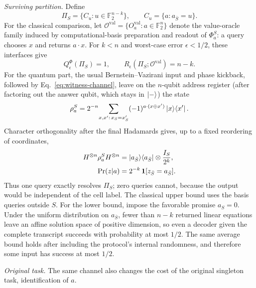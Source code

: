 \documentclass[
  aps,
  pra,
  reprint,
  nofootinbib
]{revtex4-2}
\begin{document}
\emph{Surviving partition.} Define
\begin{equation}
 \Pi_S=\{C_u:u\in\mathbb F_2^{n-k}\},\qquad
 C_u=\{a:a_{\bar S}=u\}.
 \label{eq:surviving-partition}
\end{equation}
For the classical comparison, let \(\mathcal O^{\mathrm{val}}=\{O_a^{\mathrm{val}}:a\in
\mathbb F_2^n\}\) denote the value-oracle family induced by
computational-basis preparation and readout of \(\Phi_a^S\): a query chooses
\(x\) and returns \(a\cdot x\). For \(k<n\) and worst-case error
\(\epsilon<1/2\), these interfaces give
\begin{equation}
 Q_\epsilon^{\Phi}(\Pi_S)=1,\qquad
 R_\epsilon(\Pi_S;\mathcal O^{\mathrm{val}})=n-k.
 \label{eq:partition-speedup}
\end{equation}
For the quantum part, the usual Bernstein--Vazirani input and phase kickback,
followed by Eq.~\eqref{eq:witness-channel}, leave on the \(n\)-qubit address
register (after factoring out the answer qubit, which stays in \(\ket-\)) the
state
\begin{equation}
 \rho_a^S=2^{-n}\!\sum_{x,x':\,x_S=x'_S}
 (-1)^{a\cdot(x\oplus x')}\ket x\!\bra{x'}.
 \label{eq:reduced-bv}
\end{equation}
Character orthogonality after the final Hadamards gives, up to a fixed
reordering of coordinates,
\begin{equation}
\begin{aligned}
 H^{\otimes n}\rho_a^S H^{\otimes n}
 &=\ket{a_{\bar S}}\!\bra{a_{\bar S}}\otimes\frac{I_S}{2^k},\\
 \Pr(z|a)&=2^{-k}\,\mathbf 1[z_{\bar S}=a_{\bar S}].
\end{aligned}
 \label{eq:leaky-distribution}
\end{equation}
Thus one query exactly resolves \(\Pi_S\); zero queries cannot, because the
output would be independent of the cell label. The classical upper bound uses
the basis queries outside \(S\). For the lower bound, impose the favorable
promise \(a_S=0\). Under the uniform distribution on \(a_{\bar S}\), fewer than
\(n-k\) returned linear equations leave an affine solution space of positive
dimension, so even a decoder given the complete transcript succeeds with
probability at most \(1/2\). The same average bound holds after including the
protocol's internal randomness, and therefore some input has success at most
\(1/2\).

\emph{Original task.} The same channel also changes the cost of the original
singleton task, identification of \(a\).
\end{document}
